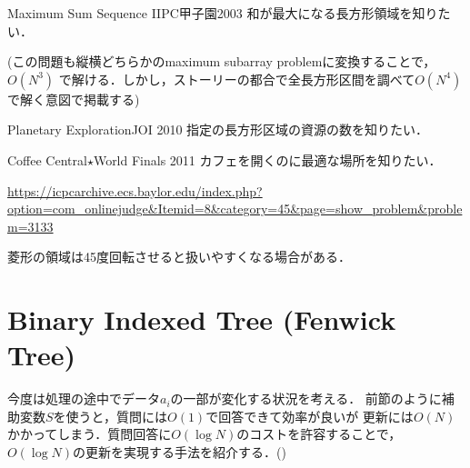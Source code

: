 \begin{versionbeta}
\begin{center}
\end{center}

\begin{psbox}{Maximum Sum Sequence II}{PC甲子園2003}
和が最大になる長方形領域を知りたい．

\end{psbox}

(この問題も縦横どちらかのmaximum subarray problemに変換することで，$O(N^3)$
で解ける．しかし，ストーリーの都合で全長方形区間を調べて$O(N^4)$で解く意図で掲載する)

\begin{pbox}{Planetary Exploration}{JOI 2010}
指定の長方形区域の資源の数を知りたい．

\end{pbox}

\begin{pbox}{Coffee Central$\star$}{World Finals 2011}
カフェを開くのに最適な場所を知りたい．

\url{https://icpcarchive.ecs.baylor.edu/index.php?option=com_onlinejudge&Itemid=8&category=45&page=show_problem&problem=3133}
\end{pbox}

菱形の領域は45度回転させると扱いやすくなる場合がある．

\section{Binary Indexed Tree (Fenwick Tree)}

今度は処理の途中でデータ$a_i$の一部が変化する状況を考える．
前節のように補助変数$S$を使うと，質問には$O(1)$で回答できて効率が良いが
更新には$O(N)$かかってしまう．質問回答に$O(\log N)$のコストを許容することで，$O(\log N)$の更新を実現する手法を紹介する．(\pccbook[pp. 160--])


\end{versionbeta}
